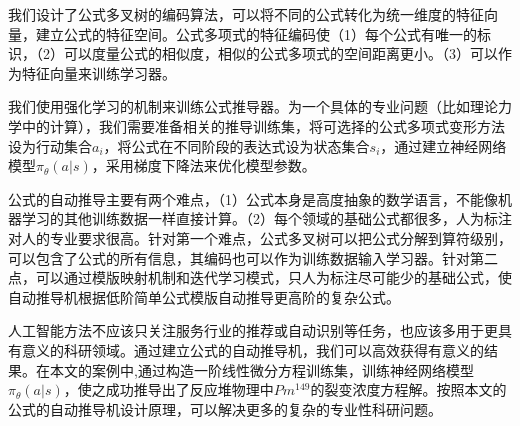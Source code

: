 \documentclass[runningheads]{llncs}
\begin{document}
我们设计了公式多叉树的编码算法，可以将不同的公式转化为统一维度的特征向量，建立公式的特征空间。公式多项式的特征编码使（1）每个公式有唯一的标识，（2）可以度量公式的相似度，相似的公式多项式的空间距离更小。（3）可以作为特征向量来训练学习器。

我们使用强化学习的机制来训练公式推导器。为一个具体的专业问题（比如理论力学中的计算），我们需要准备相关的推导训练集，将可选择的公式多项式变形方法设为行动集合${a_i}$，将公式在不同阶段的表达式设为状态集合${s_i}$，通过建立神经网络模型$\pi_{\theta}(a|s)$，采用梯度下降法来优化模型参数。

公式的自动推导主要有两个难点，（1）公式本身是高度抽象的数学语言，不能像机器学习的其他训练数据一样直接计算。（2）每个领域的基础公式都很多，人为标注对人的专业要求很高。针对第一个难点，公式多叉树可以把公式分解到算符级别，可以包含了公式的所有信息，其编码也可以作为训练数据输入学习器。针对第二点，可以通过模版映射机制和迭代学习模式，只人为标注尽可能少的基础公式，使自动推导机根据低阶简单公式模版自动推导更高阶的复杂公式。

人工智能方法不应该只关注服务行业的推荐或自动识别等任务，也应该多用于更具有意义的科研领域。通过建立公式的自动推导机，我们可以高效获得有意义的结果。在本文的案例中,通过构造一阶线性微分方程训练集，训练神经网络模型$\pi_{\theta}(a|s)$，使之成功推导出了反应堆物理中$Pm^{149}$的裂变浓度方程解。按照本文的公式的自动推导机设计原理，可以解决更多的复杂的专业性科研问题。









\end{document}
